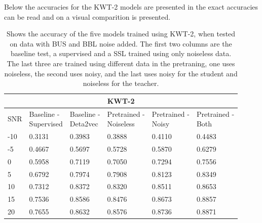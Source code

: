 Below the accuracies for the KWT-2 models are presented in  the exact accuracies can be read and on  a visual comparition is presented.

\begin{table}[H]
    \centering
    \begin{tabular}{@{}llllll@{}}
        \multicolumn{6}{c}{\textbf{KWT-2}}\\
        \toprule
        SNR    & \makecell[l]{ Baseline - \\ Supervised } & \makecell[l]{ Baseline - \\ Deta2vec } & \makecell[l]{ Pretrained - \\ Noiseless } & \makecell[l]{ Pretrained - \\ Noisy } & \makecell[l]{ Pretrained - \\ Both } \\ \midrule
        -10  & 0.3131 & 0.3983 & 0.3888 & 0.4110 & 0.4483 \\
        -5   & 0.4667 & 0.5697 & 0.5728 & 0.5870 & 0.6279 \\
        0    & 0.5958 & 0.7119 & 0.7050 & 0.7294 & 0.7556 \\
        5    & 0.6792 & 0.7974 & 0.7908 & 0.8123 & 0.8349 \\
        10   & 0.7312 & 0.8372 & 0.8320 & 0.8511 & 0.8653 \\
        15   & 0.7536 & 0.8586 & 0.8476 & 0.8673 & 0.8857 \\
        20   & 0.7655 & 0.8632 & 0.8576 & 0.8736 & 0.8871 \\
        
        \bottomrule
    \end{tabular}
    \caption{Shows the accuracy of the five models trained using KWT-2, when tested on data with BUS and BBL noise added. The first two columns are the baseline test, a supervised and a SSL trained using only noiseless data. The last three are trained using different data in the pretraning, one uses noiseless, the second uses noisy, and the last uses noisy for the student and noiseless for the teacher.}
    \label{tab:KWT-2_snrmix_busxbbl}
\end{table}

